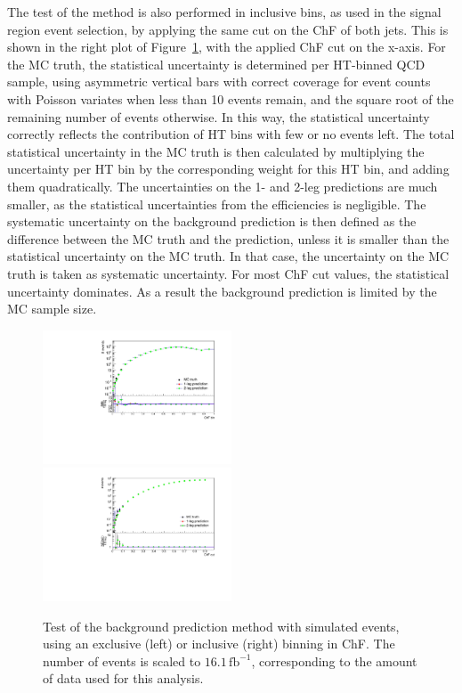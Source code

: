 The test of the method is also performed in inclusive bins, as used in the signal region event selection, by applying the same cut on the ChF of both jets. This is shown in the right plot of Figure~\ref{fig:closuretest}, with the applied ChF cut on the x-axis. For the MC truth, the statistical uncertainty is determined  per HT-binned \ac{QCD} sample, using asymmetric vertical bars with correct coverage for event counts with Poisson variates when less than 10 events remain, and the square root of the remaining number of events otherwise. In this way, the statistical uncertainty correctly reflects the contribution of HT bins with few or no events left. The total statistical uncertainty in the MC truth is then calculated by multiplying the uncertainty per HT bin by the corresponding weight for this HT bin, and adding them quadratically. The uncertainties on the 1- and 2-leg predictions are much smaller, as the statistical uncertainties from the efficiencies is negligible. The systematic uncertainty on the background prediction is then defined as the difference between the MC truth and the prediction, unless it is smaller than the statistical uncertainty on the MC truth. In that case, the uncertainty on the MC truth is taken as systematic uncertainty. For most ChF cut values, the statistical uncertainty dominates. As a result the background prediction is limited by the MC sample size.

\begin{figure}[ht]
  \includegraphics[width=0.5\textwidth]{figures/closure_test_QCD_exclusive_filters.pdf}%
  \includegraphics[width=0.5\textwidth]{figures/closure_test_ratiolog.pdf}
  \caption{Test of the background prediction method with simulated events, using an exclusive (left) or inclusive (right) binning in ChF. The number of events is scaled to $16.1\, \mathrm{fb}^{-1}$, corresponding to the amount of data used for this analysis.}
  \label{fig:closuretest}
\end{figure}

